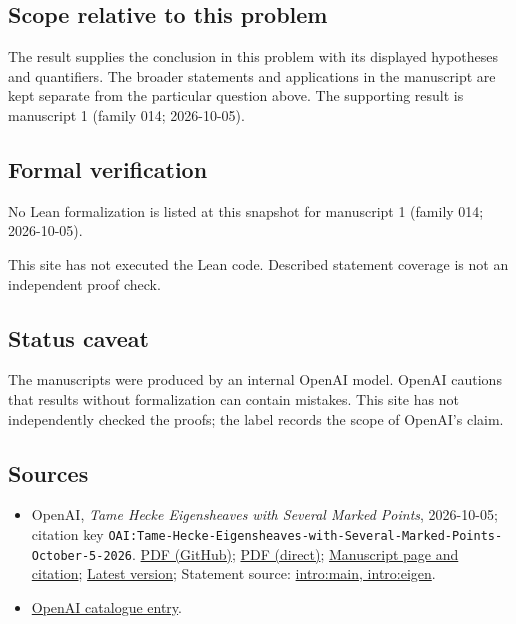 \documentclass[11pt]{article}
\begin{document}
\subsection{Scope relative to this problem}
The result supplies the conclusion in this problem with its displayed hypotheses and quantifiers. The broader statements and applications in the manuscript are kept separate from the particular question above. The supporting result is manuscript 1 (family 014; 2026-10-05).

\subsection{Formal verification}
No Lean formalization is listed at this snapshot for manuscript 1 (family 014; 2026-10-05).

This site has not executed the Lean code. Described statement coverage is not an independent proof check.

\subsection{Status caveat}
The manuscripts were produced by an internal OpenAI model. OpenAI cautions that results without formalization can contain mistakes. This site has not independently checked the proofs; the label records the scope of OpenAI's claim.

\subsection{Sources}
\begin{itemize}
\item OpenAI, \emph{Tame Hecke Eigensheaves with Several Marked Points}, 2026-10-05; citation key \texttt{OAI:Tame-Hecke-Eigensheaves-with-Several-Marked-Points-October-5-2026}. \href{https://github.com/openai/math/blob/adc7f1241b42e322a6451854ab7e4b4c146bf78a/preprints/Tame-Hecke-Eigensheaves-with-Several-Marked-Points-October-5-2026/Tame-Hecke-Eigensheaves-with-Several-Marked-Points.pdf}{PDF (GitHub)}; \href{https://github.com/openai/math/raw/adc7f1241b42e322a6451854ab7e4b4c146bf78a/preprints/Tame-Hecke-Eigensheaves-with-Several-Marked-Points-October-5-2026/Tame-Hecke-Eigensheaves-with-Several-Marked-Points.pdf}{PDF (direct)}; \href{https://github.com/openai/math/blob/adc7f1241b42e322a6451854ab7e4b4c146bf78a/preprints/Tame-Hecke-Eigensheaves-with-Several-Marked-Points-October-5-2026/README.md}{Manuscript page and citation}; \href{https://github.com/openai/math/blob/main/preprints/Tame-Hecke-Eigensheaves-with-Several-Marked-Points-October-5-2026/Tame-Hecke-Eigensheaves-with-Several-Marked-Points.pdf}{Latest version}; Statement source: \href{https://github.com/openai/math/blob/adc7f1241b42e322a6451854ab7e4b4c146bf78a/preprints/Tame-Hecke-Eigensheaves-with-Several-Marked-Points-October-5-2026/build/sections/introduction.tex\#L40}{intro:main, intro:eigen}.
\item \href{https://github.com/openai/math/blob/adc7f1241b42e322a6451854ab7e4b4c146bf78a/CONTENTS.md}{OpenAI catalogue entry}.
\end{itemize}
\end{document}
